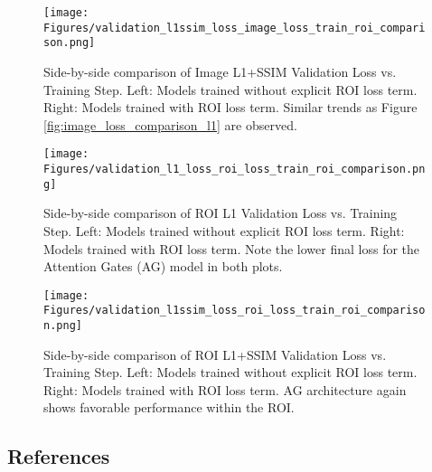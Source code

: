 \documentclass[
	letterpaper, %
]{jdf}
\begin{document}
\begin{figure*}[htbp]
    \centering
    \texttt{[image: Figures/validation\_l1ssim\_loss\_image\_loss\_train\_roi\_comparison.png]}
    \caption{Side-by-side comparison of Image L1+SSIM Validation Loss vs. Training Step. Left: Models trained without explicit ROI loss term. Right: Models trained with ROI loss term. Similar trends as Figure \ref{fig:image_loss_comparison_l1} are observed.}
    \label{fig:image_loss_comparison_l1ssim}
\end{figure*}

\begin{figure*}[htbp]
    \centering
    \texttt{[image: Figures/validation\_l1\_loss\_roi\_loss\_train\_roi\_comparison.png]}
    \caption{Side-by-side comparison of ROI L1 Validation Loss vs. Training Step. Left: Models trained without explicit ROI loss term. Right: Models trained with ROI loss term. Note the lower final loss for the Attention Gates (AG) model in both plots.}
    \label{fig:roi_loss_comparison_l1}
\end{figure*}

\begin{figure*}[htbp]
    \centering
    \texttt{[image: Figures/validation\_l1ssim\_loss\_roi\_loss\_train\_roi\_comparison.png]}
    \caption{Side-by-side comparison of ROI L1+SSIM Validation Loss vs. Training Step. Left: Models trained without explicit ROI loss term. Right: Models trained with ROI loss term. AG architecture again shows favorable performance within the ROI.}
    \label{fig:roi_loss_comparison_l1ssim}
\end{figure*}

\FloatBarrier
\subsection{References}
% 
\printbibliography[heading=none]



\end{document}
